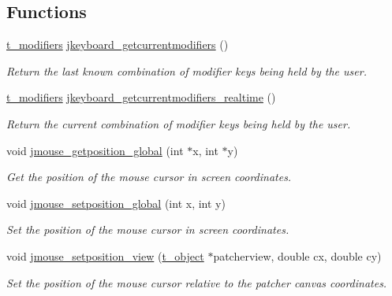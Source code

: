 \subsection*{Functions}
\begin{DoxyCompactItemize}
\item 
\hyperlink{group__jmouse_gae6e0f3193b01069c1bce512ab787a681}{t\_\-modifiers} \hyperlink{group__jmouse_gaba226c92f2227a75e696e3d302d92ca1}{jkeyboard\_\-getcurrentmodifiers} ()
\begin{DoxyCompactList}\small\item\em Return the last known combination of modifier keys being held by the user. \item\end{DoxyCompactList}\item 
\hyperlink{group__jmouse_gae6e0f3193b01069c1bce512ab787a681}{t\_\-modifiers} \hyperlink{group__jmouse_ga8e41a07bb098e3855b9c60f74d29337e}{jkeyboard\_\-getcurrentmodifiers\_\-realtime} ()
\begin{DoxyCompactList}\small\item\em Return the current combination of modifier keys being held by the user. \item\end{DoxyCompactList}\item 
void \hyperlink{group__jmouse_gaff8fb5e060894aa39293153424c5c939}{jmouse\_\-getposition\_\-global} (int $\ast$x, int $\ast$y)
\begin{DoxyCompactList}\small\item\em Get the position of the mouse cursor in screen coordinates. \item\end{DoxyCompactList}\item 
void \hyperlink{group__jmouse_ga0e92a3887f089a7cc52d142b4e99daac}{jmouse\_\-setposition\_\-global} (int x, int y)
\begin{DoxyCompactList}\small\item\em Set the position of the mouse cursor in screen coordinates. \item\end{DoxyCompactList}\item 
void \hyperlink{group__jmouse_ga030290f12df92eb02c507ed271ffcde9}{jmouse\_\-setposition\_\-view} (\hyperlink{structt__object}{t\_\-object} $\ast$patcherview, double cx, double cy)
\begin{DoxyCompactList}\small\item\em Set the position of the mouse cursor relative to the patcher canvas coordinates. \item\end{DoxyCompactList}\item 

\end{DoxyCompactItemize}
